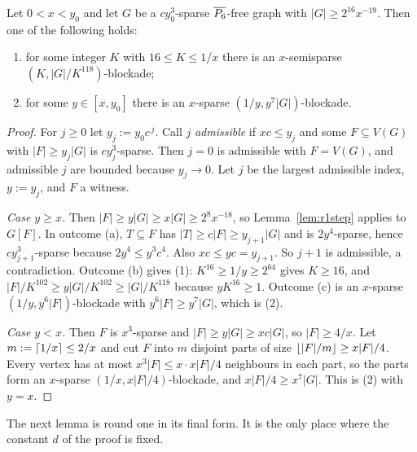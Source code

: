 \begin{lemma}\label{lem:r1}
Let $0<x<y_0$ and let $G$ be a $cy_0^3$-sparse $\overline{P_6}$-free graph with $|G|\ge2^{16}x^{-19}$. Then one of
the following holds:
\begin{enumerate}[label=(\arabic*)]
\item for some integer $K$ with $16\le K\le1/x$ there is an $x$-semisparse $(K,|G|/K^{118})$-blockade;
\item for some $y\in[x,y_0]$ there is an $x$-sparse $(1/y,y^7|G|)$-blockade.
\end{enumerate}
\end{lemma}
\begin{proof}
For $j\ge0$ let $y_j:=y_0c^{\,j}$. Call $j$ \emph{admissible} if $x c\le y_j$ and some $F\subseteq V(G)$ with
$|F|\ge y_j|G|$ is $cy_j^3$-sparse. Then $j=0$ is admissible with $F=V(G)$, and admissible $j$ are bounded
because $y_j\to0$. Let $j$ be the largest admissible index, $y:=y_j$, and $F$ a witness.

\emph{Case $y\ge x$.} Then $|F|\ge y|G|\ge x|G|\ge2^8x^{-18}$, so Lemma~\ref{lem:r1step} applies to $G[F]$.
In outcome (a), $T\subseteq F$ has $|T|\ge c|F|\ge y_{j+1}|G|$ and is $2y^4$-sparse, hence $cy_{j+1}^3$-sparse
because $2y^4\le y^3c^4$. Also $xc\le yc=y_{j+1}$. So $j+1$ is admissible, a contradiction. Outcome (b) gives
(1): $K^{16}\ge1/y\ge2^{64}$ gives $K\ge16$, and $|F|/K^{102}\ge y|G|/K^{102}\ge|G|/K^{118}$ because $yK^{16}\ge1$.
Outcome (c) is an $x$-sparse $(1/y,y^6|F|)$-blockade with $y^6|F|\ge y^7|G|$, which is (2).

\emph{Case $y<x$.} Then $F$ is $x^3$-sparse and $|F|\ge y|G|\ge xc|G|$, so $|F|\ge4/x$. Let
$m:=\lceil 1/x\rceil\le2/x$ and cut $F$ into $m$ disjoint parts of size $\lfloor |F|/m\rfloor\ge x|F|/4$. Every vertex has at
most $x^3|F|\le x\cdot x|F|/4$ neighbours in each part, so the parts form an $x$-sparse
$(1/x,x|F|/4)$-blockade, and $x|F|/4\ge x^7|G|$. This is (2) with $y=x$.
\end{proof}

The next lemma is round one in its final form. It is the only place where the constant $d$ of the proof
is fixed.


